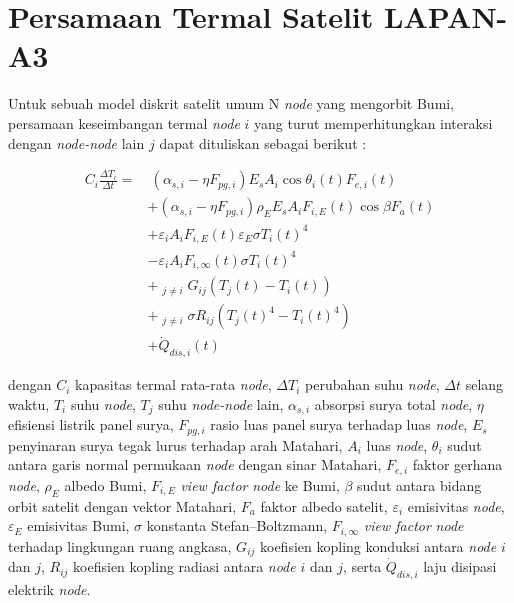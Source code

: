 \section{Persamaan Termal Satelit LAPAN-A3}

Untuk sebuah model diskrit satelit umum N \textit{node} yang mengorbit Bumi,
persamaan keseimbangan termal \textit{node} $i$ yang turut memperhitungkan interaksi
dengan \textit{node-node} lain $j$ dapat dituliskan sebagai berikut \cite{martinez2022}:

\begin{equation}
\label{eq:raweq}
\begin{split}
	C_{i} \frac{\Delta T_i}{\Delta t} = &\ \left(\alpha_{s,i} - \eta F_{pg,i}\right) E_s A_i \cos{\theta_{i}(t)} F_{e,i}(t) \\
	&+ \left(\alpha_{s,i} - \eta F_{pg,i}\right)\rho_{E} E_s A_i F_{i,E}(t) \cos{\beta} F_a(t) \\
	&+ \varepsilon_i A_i F_{i,E}(t) \varepsilon_E \sigma T_{i}(t)^4 \\
	&- \varepsilon_i A_i F_{i,\infty}(t) \sigma T_{i}(t)^4 \\
	&+ \mathop{\sum_{j=1}^{N}}_{j \neq i} G_{ij} \left(T_j(t) - T_i(t)\right) \\
	&+ \mathop{\sum_{j=1}^{N}}_{j \neq i} \sigma R_{ij}(T_{j}(t)^4-T_{i}(t)^4) \\
	&+ \dot{Q}_{dis,i}(t)
\end{split}
\end{equation}

dengan $C_i$ kapasitas termal rata-rata \textit{node}, $\Delta T_i$ perubahan suhu \textit{node},
$\Delta t$ selang waktu, $T_i$ suhu \textit{node}, $T_j$ suhu \textit{node-node} lain,
$\alpha_{s,i}$ absorpsi surya total \textit{node}, $\eta$ efisiensi listrik panel surya,
$F_{pg,i}$ rasio luas panel surya terhadap luas \textit{node}, $E_s$ penyinaran surya
tegak lurus terhadap arah Matahari, $A_i$ luas \textit{node}, $\theta_i$ sudut antara
garis normal permukaan \textit{node} dengan sinar Matahari, $F_{e,i}$ faktor gerhana
\textit{node}, $\rho_E$ albedo Bumi, $F_{i,E}$ \textit{view factor} \textit{node} ke Bumi, $\beta$ sudut
antara bidang orbit satelit dengan vektor Matahari, $F_a$ faktor albedo
satelit, $\varepsilon_i$ emisivitas \textit{node}, $\varepsilon_E$ emisivitas Bumi, $\sigma$
konstanta Stefan–Boltzmann, $F_{i,\infty}$ \textit{view factor} \textit{node} terhadap
lingkungan ruang angkasa, $G_{ij}$ koefisien kopling konduksi antara \textit{node} $i$
dan $j$, $R_{ij}$ koefisien kopling radiasi antara \textit{node} $i$ dan $j$, serta
$\dot{Q}_{dis,i}$ laju disipasi elektrik \textit{node}.

